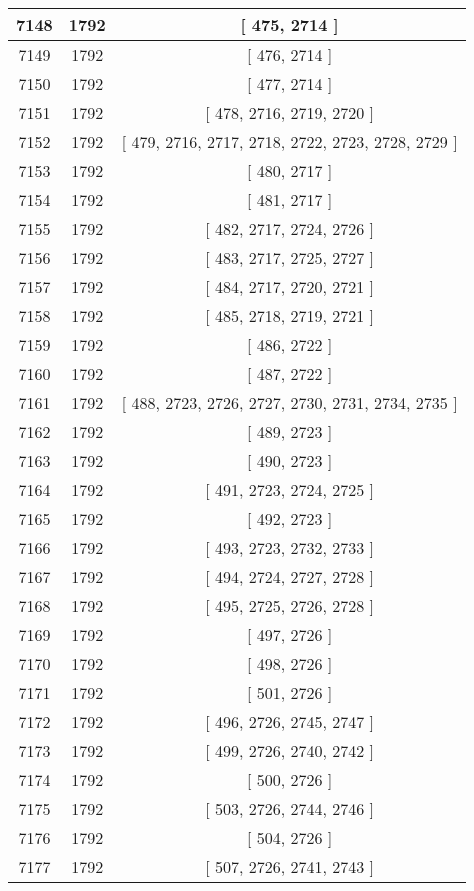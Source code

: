 \begin{center}
\begin{longtable}[H]{|| c c c ||}
\hline
7148 & 1792 & [ 475, 2714 ] \\ 
\hline
7149 & 1792 & [ 476, 2714 ] \\ 
\hline
7150 & 1792 & [ 477, 2714 ] \\ 
\hline
7151 & 1792 & [ 478, 2716, 2719, 2720 ] \\ 
\hline
7152 & 1792 & [ 479, 2716, 2717, 2718, 2722, 2723, 2728, 2729 ] \\ 
\hline
7153 & 1792 & [ 480, 2717 ] \\ 
\hline
7154 & 1792 & [ 481, 2717 ] \\ 
\hline
7155 & 1792 & [ 482, 2717, 2724, 2726 ] \\ 
\hline
7156 & 1792 & [ 483, 2717, 2725, 2727 ] \\ 
\hline
7157 & 1792 & [ 484, 2717, 2720, 2721 ] \\ 
\hline
7158 & 1792 & [ 485, 2718, 2719, 2721 ] \\ 
\hline
7159 & 1792 & [ 486, 2722 ] \\ 
\hline
7160 & 1792 & [ 487, 2722 ] \\ 
\hline
7161 & 1792 & [ 488, 2723, 2726, 2727, 2730, 2731, 2734, 2735 ] \\ 
\hline
7162 & 1792 & [ 489, 2723 ] \\ 
\hline
7163 & 1792 & [ 490, 2723 ] \\ 
\hline
7164 & 1792 & [ 491, 2723, 2724, 2725 ] \\ 
\hline
7165 & 1792 & [ 492, 2723 ] \\ 
\hline
7166 & 1792 & [ 493, 2723, 2732, 2733 ] \\ 
\hline
7167 & 1792 & [ 494, 2724, 2727, 2728 ] \\ 
\hline
7168 & 1792 & [ 495, 2725, 2726, 2728 ] \\ 
\hline
7169 & 1792 & [ 497, 2726 ] \\ 
\hline
7170 & 1792 & [ 498, 2726 ] \\ 
\hline
7171 & 1792 & [ 501, 2726 ] \\ 
\hline
7172 & 1792 & [ 496, 2726, 2745, 2747 ] \\ 
\hline
7173 & 1792 & [ 499, 2726, 2740, 2742 ] \\ 
\hline
7174 & 1792 & [ 500, 2726 ] \\ 
\hline
7175 & 1792 & [ 503, 2726, 2744, 2746 ] \\ 
\hline
7176 & 1792 & [ 504, 2726 ] \\ 
\hline
7177 & 1792 & [ 507, 2726, 2741, 2743 ] \\ 
\hline

\end{longtable}
\end{center}
